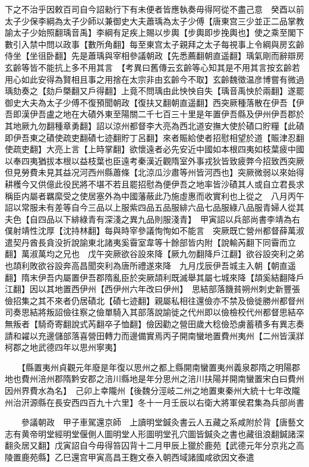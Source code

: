 下之不治乎因敕百司自今詔勑行下有未便者皆應執奏毋得阿從不盡己意　癸酉以前太子少保李綱為太子少師以兼御史大夫蕭瑀為太子少傅【唐東宫三少並正二品掌教諭太子少始照翻瑀音禹】李綱有足疾上賜以步輿【步輿即步挽輿也】使之乘至閣下數引入禁中問以政事【數所角翻】每至東宫太子親拜之太子每視事上令綱與房玄齡侍坐【坐徂卧翻】先是蕭瑀與宰相參議朝政【先悉薦翻朝直遥翻】瑀氣剛而辭辯房玄齡等皆不能抗上多不用其言　【考異曰舊傳云玄齡等心知其是不用其言按玄齡若用心如此安得為賢相且事之用捨在太宗非由玄齡今不取】玄齡魏徵温彦博嘗有微過瑀劾奏之【劾戶槩翻又戶得翻】上竟不問瑀由此怏怏自失【瑀音禹怏於兩翻】遂罷御史大夫為太子少傅不復預聞朝政【復扶又翻朝直遥翻】西突厥種落散在伊吾【伊吾即漢伊吾盧之地在大磧外東至陽關二千七百三十里是年置伊吾縣及伊州伊吾郡於其地厥九勿翻種章勇翻】詔以涼州都督李大亮為西北道安撫大使於磧口貯糧【此磧即伊吾東之磧使疏吏翻磧七迹翻貯丁呂翻】來者賑給使者招慰相望於道【賑津忍翻使疏吏翻】大亮上言【上時掌翻】欲懷遠者必先安近中國如本根四夷如枝葉疲中國以奉四夷猶拔本根以益枝葉也臣遠考秦漢近觀隋室外事戎狄皆致疲弊今招致西突厥但見勞費未見其益况河西州縣蕭條【北涼瓜沙肅等州皆河西也】突厥微弱以來始得耕穫今又供億此役民將不堪不若且罷招慰為便伊吾之地率皆沙磧其人或自立君長求稱臣内屬者羈縻受之使居塞外為中國藩蔽此乃施虛惠而收實利也上從之　八月丙午詔以常服未有差等自今三品以上服紫四品五品服緋六品七品服綠八品服青婦人從其夫色【自四品以下緋綠青有深淺之異九品則服淺青】　甲寅詔以兵部尚書李靖為右僕射靖性沈厚【沈持林翻】每與時宰參議恂恂如不能言　突厥既亡營州都督薛萬淑遣契丹酋長貪没折說諭東北諸夷奚霫室韋等十餘部皆内附【說輸芮翻下同霫而立翻】萬淑萬均之兄也　戊午突厥欲谷設來降【厥九勿翻降戶江翻】欲谷設突利之弟也頡利敗欲谷設奔高昌聞突利為唐所禮遂來降　九月戊辰伊吾城主入朝【朝直遥翻】隋末伊吾内屬置伊吾郡隋亂臣於突厥頡利既滅舉其屬七城來降【頡奚結翻降戶江翻】因以其地置西伊州【西伊州六年改曰伊州】　思結部落饑貧朔州刺史新豐張儉招集之其不來者仍居磧北【磧七迹翻】親屬私相往還儉亦不禁及儉徙勝州都督州司奏思結將叛詔儉往察之儉單騎入其部落說諭徙之代州即以儉檢校代州都督思結卒無叛者【騎奇寄翻說式芮翻卒子恤翻】儉因勸之營田歲大稔儉恐虜蓄積多有異志奏請和糴以充邊儲部落喜營田轉力而邊備實焉丙子開南蠻地置費州夷州【二州皆漢牂柯郡之地武德四年以思州寧夷】

　　【縣置夷州貞觀元年廢是年復以思州之都上縣開南蠻置夷州義泉郡隋之明陽郡地也費州涪州郡隋黔安郡之涪川縣地是年分思州之涪川扶陽并開南蠻置宋白曰費州因州界費水為名】　己卯上幸隴州【後魏分涇岐二州之地置東秦州大統十七年改隴州治汧源縣在長安西四百九十六里】冬十一月壬辰以右衛大將軍侯君集為兵部尚書

　　參議朝政　甲子車駕還京師　上讀明堂鍼灸書云人五藏之系咸附於背【唐藝文志有黄帝明堂經明堂偃側人圖明堂人形圖明堂孔穴圖皆鍼灸之書也藏徂浪翻鍼諸深翻灸居又翻】戊寅詔自今毋得笞囚背十二月甲辰上獵於鹿苑【武德元年分京兆之高陵置鹿苑縣】乙巳還宫甲寅高昌王麴文泰入朝西域諸國咸欲因文泰遣

